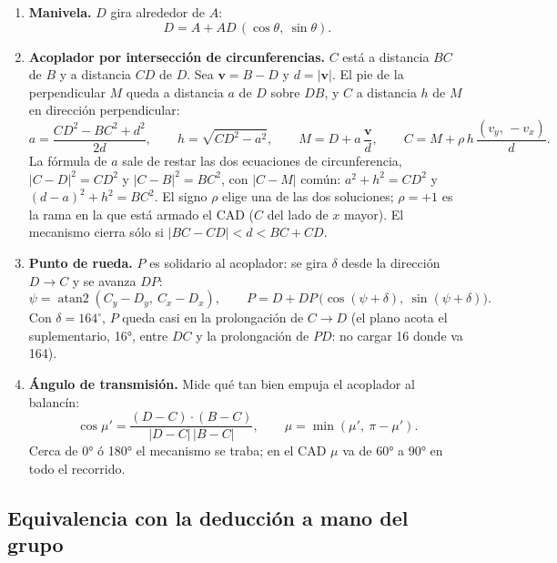 \documentclass[11pt,a4paper]{article}
\newcommand{\atan}{\operatorname{atan2}}
\begin{document}
\begin{enumerate}\itemsep3pt
  \item \textbf{Manivela.} $D$ gira alrededor de $A$:
  \begin{equation}
    D = A + AD\,(\cos\theta,\ \sin\theta).
    \label{eq:D}
  \end{equation}
  \item \textbf{Acoplador por intersección de circunferencias.} $C$ está a distancia $BC$ de $B$ y a
  distancia $CD$ de $D$. Sea $\bm v = B - D$ y $d = |\bm v|$. El pie de la perpendicular $M$ queda a
  distancia $a$ de $D$ sobre $DB$, y $C$ a distancia $h$ de $M$ en dirección perpendicular:
  \begin{equation}
    a = \frac{CD^2 - BC^2 + d^2}{2d}, \qquad h = \sqrt{CD^2 - a^2}, \qquad
    M = D + a\,\frac{\bm v}{d}, \qquad C = M + \rho\, h\,\frac{(v_y,\,-v_x)}{d}.
    \label{eq:C}
  \end{equation}
  La fórmula de $a$ sale de restar las dos ecuaciones de circunferencia, $|C-D|^2 = CD^2$ y
  $|C-B|^2 = BC^2$, con $|C-M|$ común: $a^2 + h^2 = CD^2$ y $(d-a)^2 + h^2 = BC^2$. El signo $\rho$
  elige una de las dos soluciones; $\rho = +1$ es la rama en la que está armado el CAD ($C$ del lado
  de $x$ mayor). El mecanismo cierra sólo si $|BC - CD| < d < BC + CD$.
  \item \textbf{Punto de rueda.} $P$ es solidario al acoplador: se gira $\delta$ desde la dirección
  $D\!\to\!C$ y se avanza $DP$:
  \begin{equation}
    \psi = \atan(C_y - D_y,\ C_x - D_x), \qquad P = D + DP\,\big(\cos(\psi+\delta),\ \sin(\psi+\delta)\big).
    \label{eq:P}
  \end{equation}
  Con $\delta = 164^\circ $, $P$ queda casi en la prolongación de $C\!\to\!D$ (el plano acota el
  suplementario, 16°, entre $DC$ y la prolongación de $PD$: no cargar 16 donde va 164).
  \item \textbf{Ángulo de transmisión.} Mide qué tan bien empuja el acoplador al balancín:
  \begin{equation}
    \cos\mu' = \frac{(D-C)\cdot(B-C)}{|D-C|\,|B-C|}, \qquad \mu = \min(\mu',\ \pi - \mu').
    \label{eq:mu}
  \end{equation}
  Cerca de 0° ó 180° el mecanismo se traba; en el CAD $\mu$ va de 60° a 90° en todo el recorrido.
\end{enumerate}

\subsection{Equivalencia con la deducción a mano del grupo}
\end{document}
